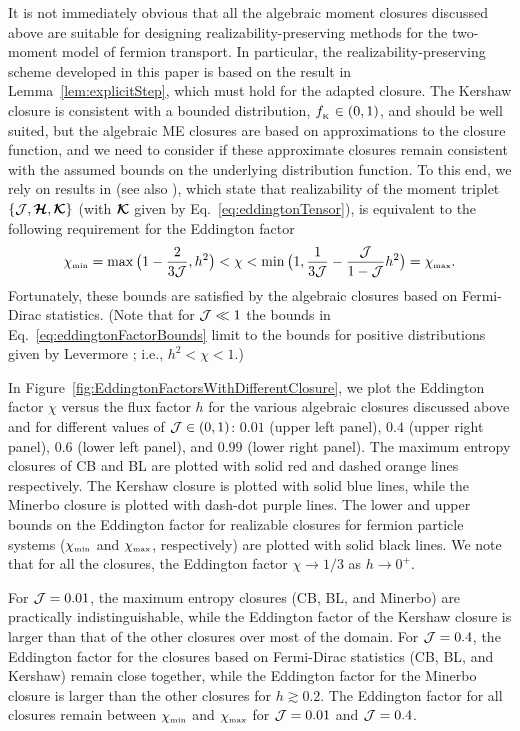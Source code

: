 It is not immediately obvious that all the algebraic moment closures discussed above are suitable for designing realizability-preserving methods for the two-moment model of fermion transport.  
In particular, the realizability-preserving scheme developed in this paper is based on the result in Lemma~\ref{lem:explicitStep}, which must hold for the adapted closure.  
The Kershaw closure is consistent with a bounded distribution, $f_{_{\mbox{\tiny K}}}\in(0,1)$, and should be well suited, but the algebraic ME closures are based on approximations to the closure function, and we need to consider if these approximate closures remain consistent with the assumed bounds on the underlying distribution function.  
To this end, we rely on results in \cite{levermore_1984,lareckiBanach_2011} (see also \cite{kershaw_1976,shohatTamarkin_1943}), which state that realizability of the moment triplet $\{\mathcal{J},\boldsymbol{\mathcal{H}},\boldsymbol{\mathcal{K}}\}$ (with $\boldsymbol{\mathcal{K}}$ given by Eq.~\eqref{eq:eddingtonTensor}), is equivalent to the following requirement for the Eddington factor
\begin{equation}
  \chi_{\mbox{\tiny min}}
  =\max\big(1-\frac{2}{3\mathcal{J}},h^{2}\big)
  <\chi<\min\big(1,\frac{1}{3\mathcal{J}}-\frac{\mathcal{J}}{1-\mathcal{J}}h^{2}\big)=\chi_{\mbox{\tiny max}}.  
  \label{eq:eddingtonFactorBounds}
\end{equation}
Fortunately, these bounds are satisfied by the algebraic closures based on Fermi-Dirac statistics.  
(Note that for $\mathcal{J}\ll1$ the bounds in Eq.~\eqref{eq:eddingtonFactorBounds} limit to the bounds for positive distributions given by Levermore \cite{levermore_1984}; i.e., $h^{2}<\chi<1$.)

In Figure~\ref{fig:EddingtonFactorsWithDifferentClosure}, we plot the Eddington factor $\chi$ versus the flux factor $h$ for the various algebraic closures discussed above and for different values of $\mathcal{J}\in(0,1)$: $0.01$ (upper left panel), $0.4$ (upper right panel), $0.6$ (lower left panel), and $0.99$ (lower right panel).  
The maximum entropy closures of CB and BL are plotted with solid red and dashed orange lines respectively.  
The Kershaw closure is plotted with solid blue lines, while the Minerbo closure is plotted with dash-dot purple lines.  
The lower and upper bounds on the Eddington factor for realizable closures for fermion particle systems ($\chi_{\mbox{\tiny min}}$ and $\chi_{\mbox{\tiny max}}$, respectively) are plotted with solid black lines.  
We note that for all the closures, the Eddington factor $\chi\to1/3$ as $h\to0^{+}$.  

For $\mathcal{J}=0.01$, the maximum entropy closures (CB, BL, and Minerbo) are practically indistinguishable, while the Eddington factor of the Kershaw closure is larger than that of the other closures over most of the domain.  
For $\mathcal{J}=0.4$, the Eddington factor for the closures based on Fermi-Dirac statistics (CB, BL, and Kershaw) remain close together, while the Eddington factor for the Minerbo closure is larger than the other closures for $h\gtrsim0.2$.  
The Eddington factor for all closures remain between $\chi_{\mbox{\tiny min}}$ and $\chi_{\mbox{\tiny max}}$ for $\mathcal{J}=0.01$ and $\mathcal{J}=0.4$.  

